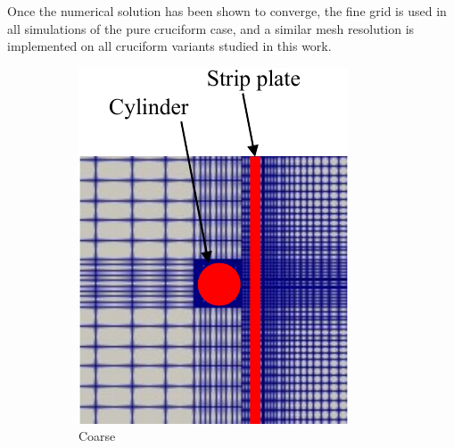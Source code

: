 \documentclass[oneside]{utmthesis}
\begin{document}
Once the numerical solution has been shown to converge, the fine grid is used in all simulations of the pure cruciform case, and a similar mesh resolution is implemented on all cruciform variants studied in this work.

\begin{figure}[!h]
  \centering
  \begin{subfigure}[h]{0.3\textwidth}
    \includegraphics[width=\textwidth]{figs/threeGridsCoarse}
    \caption{Coarse}
    \label{fig:coarseMesh}
  \end{subfigure} \hspace{0.25cm}
  \begin{subfigure}[h]{0.3\textwidth}

\end{subfigure}
\end{figure}
\end{document}
